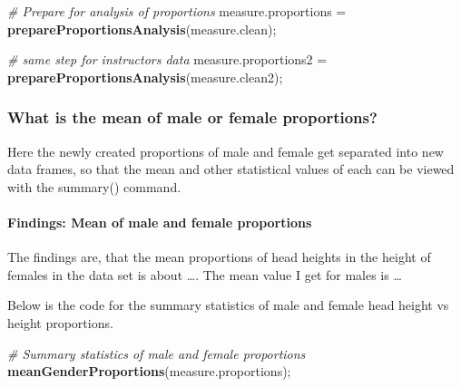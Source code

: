 \documentclass[]{article}
\newenvironment{Shaded}{\begin{snugshade}}{\end{snugshade}}
\newcommand{\CommentTok}[1]{\textcolor[rgb]{0.56,0.35,0.01}{\textit{#1}}}
\newcommand{\KeywordTok}[1]{\textcolor[rgb]{0.13,0.29,0.53}{\textbf{#1}}}
\newcommand{\NormalTok}[1]{#1}
\newcommand{\StringTok}[1]{\textcolor[rgb]{0.31,0.60,0.02}{#1}}
\begin{document}
\begin{Shaded}
\begin{Highlighting}[]
\CommentTok{\# Prepare for analysis of proportions}
\NormalTok{measure.proportions =}\StringTok{ }\KeywordTok{prepareProportionsAnalysis}\NormalTok{(measure.clean);}

\CommentTok{\# same step for instructors data}
\NormalTok{measure.proportions2 =}\StringTok{ }\KeywordTok{prepareProportionsAnalysis}\NormalTok{(measure.clean2);}
\end{Highlighting}
\end{Shaded}

\newpage

\subsubsection{What is the mean of male or female proportions?}
\label{sec:appendix-mean-gender-proportions}

Here the newly created proportions of male and female get separated into
new data frames, so that the mean and other statistical values of each
can be viewed with the summary() command.

\paragraph{Findings: Mean of male and female proportions}
\label{sec:appendix-findings-mean-gender-proportions}

The findings are, that the mean proportions of head heights in the
height of females in the data set is about \ldots. The mean value I get
for males is \ldots{}

Below is the code for the summary statistics of male and female head
height vs height proportions.

\begin{Shaded}
\begin{Highlighting}[]
\CommentTok{\# Summary statistics of male and female proportions}
\KeywordTok{meanGenderProportions}\NormalTok{(measure.proportions);}
\end{Highlighting}
\end{Shaded}
\end{document}
